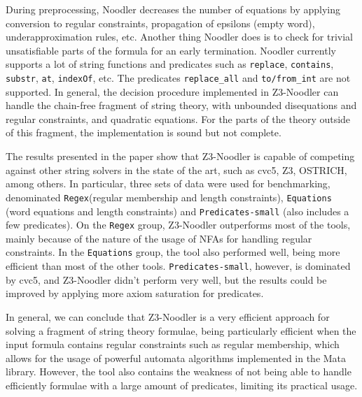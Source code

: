 \documentclass{article}
\begin{document}
During preprocessing, Noodler decreases the number of equations by applying conversion to regular constraints, propagation of epsilons (empty word), underapproximation rules, etc.
Another thing Noodler does is to check for trivial unsatisfiable parts of the formula for an early termination. Noodler currently supports a lot of
string functions and predicates such as \texttt{replace}, \texttt{contains}, \texttt{substr}, \texttt{at}, \texttt{indexOf}, etc. The predicates \texttt{replace\_all} and
\texttt{to/from\_int} are not supported. In general, the decision procedure implemented in Z3-Noodler can handle the chain-free fragment of string theory, with unbounded
disequations and regular constraints, and quadratic equations. For the parts of the theory outside of this fragment, the implementation is sound but not complete.

The results presented in the paper show that Z3-Noodler is capable of competing against other string solvers in the state of the art, such as cvc5, Z3, OSTRICH, among others. In particular, three sets of data were used for benchmarking, denominated \texttt{Regex}(regular membership and length constraints), \texttt{Equations} (word equations and length constraints) and \texttt{Predicates-small} (also includes a few predicates). On the \texttt{Regex} group, Z3-Noodler outperforms most of the tools, mainly because of the nature of the usage of NFAs for handling regular constraints. In the \texttt{Equations} group, the tool also performed well, being more efficient than most of the other tools. \texttt{Predicates-small}, however, is dominated by cvc5, and Z3-Noodler didn't perform very well, but the results could be improved by applying more axiom saturation for predicates.

In general, we can conclude that Z3-Noodler is a very efficient approach for solving a fragment of string theory formulae, being particularly efficient when the input formula contains regular constraints such as regular membership, which allows for the usage of powerful automata algorithms implemented in the Mata library. However, the tool also contains the weakness of not being able to handle efficiently formulae with a large amount of predicates, limiting its practical usage.
\end{document}
